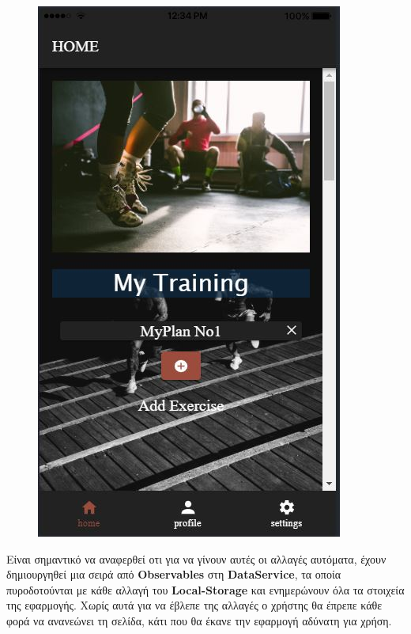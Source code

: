 \documentclass[a4paper,12pt]{article}
\begin{document}
\begin{figure}[!htb]
				\endminipage\hfill
				  \includegraphics[width=\linewidth]{plan6}
				\endminipage\hfill

			\end{figure}
			\vspace*{1cm}
			Είναι σημαντικό να αναφερθεί οτι για να γίνουν αυτές οι αλλαγές αυτόματα, έχουν δημιουργηθεί μια σειρά από 
			\textbf{Observables} στη \textbf{DataService}, τα οποία πυροδοτούνται με κάθε αλλαγή του \textbf{Local-Storage} και ενημερώνουν όλα τα στοιχεία της εφαρμογής. 
			Χωρίς αυτά για να έβλεπε της αλλαγές ο χρήστης θα έπρεπε κάθε φορά να ανανεώνει τη σελίδα, κάτι που θα έκανε 
			την εφαρμογή αδύνατη για χρήση.
		
\end{document}

